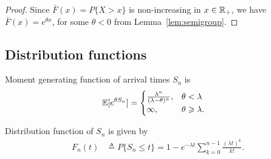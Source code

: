 \documentclass[a4paper,10pt,english]{article}
\begin{document}
\begin{proof}
Since $\bar{F}(x) = P\{X > x\}$  is non-increasing in $x \in \mathbb{R}_+$, we have $\bar{F}(x) = e^{\theta x}$, for some $\theta < 0$ from Lemma~\ref{lem:semigroup}.
\end{proof}

\subsection{Distribution functions}
\begin{lem} Moment generating function of arrival times $S_n$ is 
 \begin{align*}
\mathbb{E}[e^{\theta S_n} ] &= \begin{cases}
\frac{\lambda^n}{(\lambda-\theta)^n}, & \theta < \lambda \\ \infty, & \theta \geqslant \lambda.
\end{cases} 
 \end{align*} 
\end{lem}
\begin{lem} Distribution function of $S_n$ is given by 
 \begin{align*}
 F_n(t) &\triangleq P\{S_n \leq t\} = 1 - e^{-\lambda t}\sum_{k=0}^{n-1}\frac{(\lambda t)^k}{k!}.
 \end{align*}
\end{lem}
\end{document}
